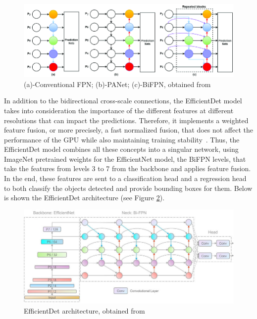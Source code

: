 \begin{figure}[!ht]
    \centering
    \includegraphics[width=1\textwidth]{figures/Figure6.png}
    \caption{(a)-Conventional FPN; (b)-PANet; (c)-BiFPN, obtained from ~\cite{link14}}
    \label{fig:fig6}
\end{figure}

In addition to the bidirectional cross-scale connections, the EfficientDet model takes into consideration the importance of the different features at different resolutions that can impact the predictions. Therefore, it implements a weighted feature fusion, or more precisely, a fast normalized fusion, that does not affect the performance of the GPU while also maintaining training stability~\cite{carte8}.
Thus, the EfficientDet model combines all these concepts into a singular network, using ImageNet pretrained weights for the EfficientNet model, the BiFPN levels, that take the features from levels 3 to 7 from the backbone and applies feature fusion. In the end, these features are sent to a classification head and a regression head to both classify the objects detected and provide bounding boxes for them. Below is shown the EfficientDet architecture (see Figure \ref{fig:fig7}).

\begin{figure}[!ht]
    \centering
    \includegraphics[width=1\textwidth]{figures/Figure7.jpg}
    \caption{EfficientDet architecture, obtained from ~\cite{link15}}
    \label{fig:fig7}
\end{figure}